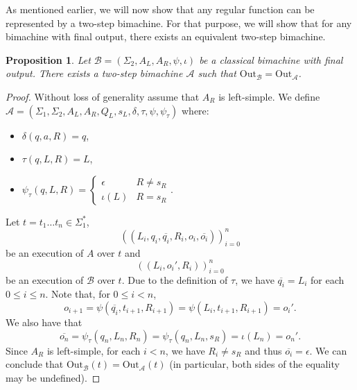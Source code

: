 \documentclass{article}
\newtheorem{proposition}[definition]{Proposition}
\begin{document}
	As mentioned earlier, we will now show that any regular function can be represented by a two-step bimachine. For that purpose, we will show that for any bimachine with final output, there exists an equivalent two-step bimachine.
	\begin{proposition} \label{prop:equivalence_TSBM-BMFO}
		Let $\mathcal{B} = (\Sigma_2, A_L, A_R, \psi, \iota)$ be a classical bimachine with final output. There exists a two-step bimachine $\mathcal{A}$ such that $\mathrm{Out}_\mathcal{B} = \mathrm{Out}_\mathcal{A}$.
	\end{proposition}
	\begin{proof}
		Without loss of generality assume that $A_R$ is left-simple.
		We define $\mathcal{A} = (\Sigma_1, \Sigma_2, A_L, A_R, Q_L, s_L, \delta, \tau, \psi, \psi_\tau)$ where:
		\begin{itemize}
			\item \( \delta(q, a, R) = q \),
			\item \( \tau(q, L, R) = L \),
			\item \( \psi_\tau(q, L, R) = 
			\begin{cases}
				\epsilon & R\ne s_R \\
				\iota(L) & R = s_R
			\end{cases}
			\).
		\end{itemize}
		Let $t=t_1\ldots t_n\in \Sigma_1^*$,
		\[ ((L_i, q_i, \overline{q_i}, R_i, o_i, \overline{o_i}))_{i=0}^n \]
		be an execution of $A$ over $t$ and 
		\[ ((L_i, o_i', R_i))_{i=0}^n \]
		be an execution of $\mathcal{B}$ over $t$. Due to the definition of $\tau$, we have $\overline{q_i} = L_i$ for each $0\le i\le n$. Note that, for $0\le i < n$,
		\[ o_{i+1} = \psi(\overline{q_i}, t_{i+1}, R_{i+1}) = \psi(L_i, t_{i+1}, R_{i+1}) = o_i'. \]
		We also have that
		\[ \overline{o_n} = \psi_\tau(q_n, L_n, R_n) = \psi_\tau(q_n, L_n, s_R) = \iota(L_n) = o_n'. \]
		Since $A_R$ is left-simple, for each $i < n$, we have $R_i\ne s_R$ and thus $\overline{o_i} = \epsilon$.
		We can conclude that $\mathrm{Out}_\mathcal{B}(t) = \mathrm{Out}_\mathcal{A}(t)$ (in particular, both sides of the equality may be undefined).
	\end{proof}
\end{document}

